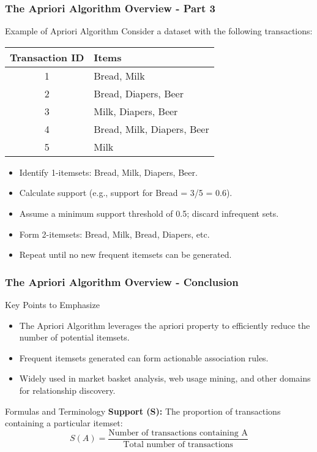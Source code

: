 \documentclass[aspectratio=169]{beamer}
\begin{document}
\begin{frame}[fragile]
    \frametitle{The Apriori Algorithm Overview - Part 3}
    \begin{block}{Example of Apriori Algorithm}
        Consider a dataset with the following transactions:
        \begin{tabular}{|c|l|}
            \hline
            Transaction ID & Items \\
            \hline
            1 & {Bread, Milk} \\
            2 & {Bread, Diapers, Beer} \\
            3 & {Milk, Diapers, Beer} \\
            4 & {Bread, Milk, Diapers, Beer} \\
            5 & {Milk} \\
            \hline
        \end{tabular}
        
        \begin{itemize}
            \item Identify 1-itemsets: {Bread}, {Milk}, {Diapers}, {Beer}.
            \item Calculate support (e.g., support for {Bread} = 3/5 = 0.6).
            \item Assume a minimum support threshold of 0.5; discard infrequent sets.
            \item Form 2-itemsets: {Bread, Milk}, {Bread, Diapers}, etc.
            \item Repeat until no new frequent itemsets can be generated.
        \end{itemize}
    \end{block}
\end{frame}

\begin{frame}[fragile]
    \frametitle{The Apriori Algorithm Overview - Conclusion}
    \begin{block}{Key Points to Emphasize}
        \begin{itemize}
            \item The Apriori Algorithm leverages the apriori property to efficiently reduce the number of potential itemsets.
            \item Frequent itemsets generated can form actionable association rules.
            \item Widely used in market basket analysis, web usage mining, and other domains for relationship discovery.
        \end{itemize}
    \end{block}

    \begin{block}{Formulas and Terminology}
        \textbf{Support (S):} The proportion of transactions containing a particular itemset:
        \begin{equation}
            S(A) = \frac{\text{Number of transactions containing A}}{\text{Total number of transactions}}
        \end{equation}
    \end{block}
\end{frame}
\end{document}
